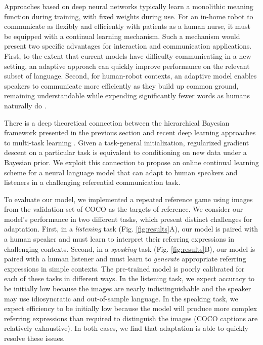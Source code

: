 \documentclass[11pt]{article}
\begin{document}
Approaches based on deep neural networks typically learn a monolithic meaning function during training, with fixed weights during use.
For an in-home robot to communicate as flexibly and efficiently with patients as a human nurse, it must be equipped with a continual learning mechanism. Such a mechanism would present two specific advantages for interaction and communication applications.
First, to the extent that current models have difficulty communicating in a new setting, an adaptive approach can quickly improve performance on the relevant subset of language.
Second, for human-robot contexts, an adaptive model enables speakers to communicate more efficiently as they build up common ground, remaining understandable while expending significantly fewer words as humans naturally do \cite{ClarkWilkesGibbs86_ReferringCollaborative}.


There is a deep theoretical connection between the hierarchical Bayesian framework presented in the previous section and recent deep learning approaches to multi-task learning \cite{nagabandi_deep_2018,grant_recasting_2018,jerfel_online_2018}. 
Given a task-general initialization, regularized gradient descent on a particular task is equivalent to conditioning on new data under a Bayesian prior.
We exploit this connection to propose an online continual learning scheme for a neural language model that can adapt to human speakers and listeners in a challenging referential communication task.


To evaluate our model, we implemented a repeated reference game using images from the validation set of COCO \cite{lin2014microsoft} as the targets of reference.
We consider our model's performance in two different tasks, which present distinct challenges for adaptation.
First, in a \emph{listening} task (Fig. \ref{fig:results}A), our model is paired with a human speaker and must learn to interpret their referring expressions in challenging contexts.
Second, in a \emph{speaking} task (Fig. \ref{fig:results}B), our model is paired with a human listener and must learn to \emph{generate} appropriate referring expressions in simple contexts.
The pre-trained model is poorly calibrated for each of these tasks in different ways. 
In the listening task, we expect accuracy to be initially low because the images are nearly indistinguishable and the speaker may use idiosyncratic and out-of-sample language. 
In the speaking task, we expect efficiency to be initially low because the model will produce more complex referring expressions than required to distinguish the images (COCO captions are relatively exhaustive).
In both cases, we find that adaptation is able to quickly resolve these issues.
\end{document}
